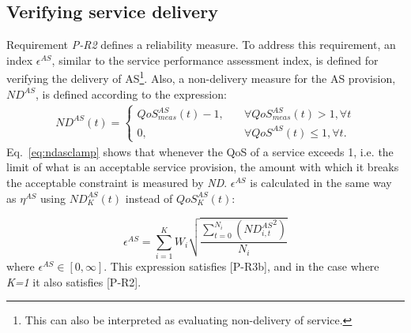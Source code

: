
\subsection{Verifying service delivery}
Requirement \emph{P-R2} defines a reliability measure. To address this requirement, an index $\epsilon^{AS}$, similar to the service performance assessment index, is defined for verifying the delivery of AS\footnote{This can also be interpreted as evaluating non-delivery of service.}. Also, a non-delivery measure for the AS provision, $ND^{AS}$, is defined according to the expression:
\begin{align}
	ND^{AS}(t) = \begin{cases} QoS^{AS}_{meas}(t) - 1,\quad &\forall QoS^{AS}_{meas}(t) > 1, \forall t\\
	0, \quad &\forall QoS^{AS}(t) \leq 1, \forall t.
	\end{cases}\label{eq:ndasclamp}
\end{align}
Eq.~\eqref{eq:ndasclamp} shows that whenever the QoS of a service exceeds 1, i.e. the limit of what is an acceptable service provision, the amount with which it breaks the acceptable constraint is measured by \emph{ND}.
$\epsilon^{AS}$ is calculated in the same way as $\eta^{AS}$ using $ND^{AS}_K(t)$ instead of $QoS^{AS}_{K}(t)$:

\begin{equation}\label{eq:TSGepsilonAS}
\epsilon^{AS} = \sum^{K}_{i=1} W_i \sqrt{\frac{\sum^{N_i}_{t=0} \left( {ND^{AS}_{i,t}}^{2} \right)}{N_i}}
\end{equation}
where $\epsilon^{AS} \in [0,\infty]$. This expression satisfies [P-R3b], and in the case where \emph{K=1} it also satisfies [P-R2].

